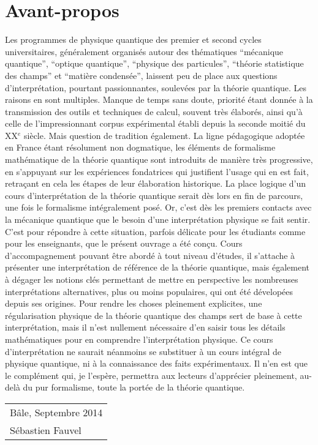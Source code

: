 \cleardoublepage

\section*{Avant-propos}

Les programmes de physique quantique des premier et second cycles universitaires,
généralement organisés autour des thématiques ``mécanique quantique'', ``optique quantique'',
``physique des particules'', ``théorie statistique des champs'' et ``matière condensée'',
laissent peu de place aux questions d'interprétation, pourtant passionnantes, soulevées par la théorie quantique.
Les raisons en sont multiples.
Manque de temps sans doute,
priorité étant donnée à la transmission des outils et techniques de calcul, souvent très élaborés,
ainsi qu'à celle de l'impressionnant corpus expérimental établi depuis la seconde moitié du XX$^e$ siècle.
Mais question de tradition également.
La ligne pédagogique adoptée en France étant résolument non dogmatique,
les éléments de formalisme mathématique de la théorie quantique sont introduits de manière très progressive,
en s'appuyant sur les expériences fondatrices qui justifient l'usage qui en est fait,
retraçant en cela les étapes de leur élaboration historique.
La place logique d'un cours d'interprétation de la théorie quantique serait dès lors en fin de parcours,
une fois le formalisme intégralement posé.
Or, c'est dès les premiers contacts avec la mécanique quantique que le besoin d'une interprétation physique se fait sentir.
C'est pour répondre à cette situation, parfois délicate pour les étudiants comme pour les enseignants,
que le présent ouvrage a été conçu.
Cours d'accompagnement pouvant être abordé à tout niveau d'études,
il s'attache à présenter une interprétation de référence de la théorie quantique,
mais également à dégager les notions clés permettant de mettre en perspective les nombreuses interprétations alternatives,
plus ou moins populaires, qui ont été dévelopées depuis ses origines.
Pour rendre les choses pleinement explicites,
une régularisation physique de la théorie quantique des champs sert de base à cette interprétation,
mais il n'est nullement nécessaire d'en saisir tous les détails mathématiques pour en comprendre l'interprétation physique.
Ce cours d'interprétation ne saurait néanmoins se substituer à un cours intégral de physique quantique,
ni à la connaissance des faits expérimentaux.
Il n'en est que le complément qui, je l'espère, permettra aux lecteurs d'apprécier pleinement,
au-delà du pur formalisme, toute la portée de la théorie quantique.

\begin{flushright}
\begin{tabular}{l}
Bâle, Septembre 2014\\
Sébastien Fauvel
\end{tabular}
\end{flushright}
